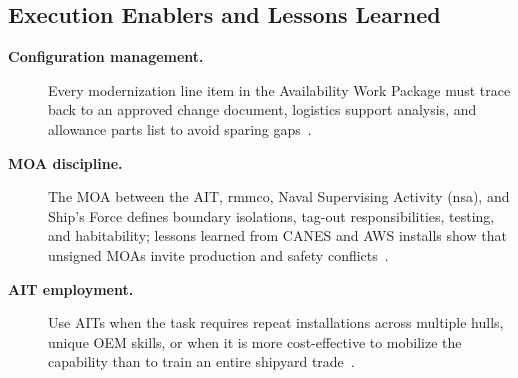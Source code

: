 \documentclass[../main.tex]{subfiles}
\begin{document}
\subsection{Execution Enablers and Lessons Learned}
\begin{description}
\item[\textbf{Configuration management.}] Every modernization line item in the Availability Work Package must trace back to an approved change document, logistics support analysis, and allowance parts list to avoid sparing gaps~\autocite{COMFLTFORCOMINST4790-3}.
\item[\textbf{MOA discipline.}] The MOA between the AIT, \ac{rmmco}, Naval Supervising Activity (\ac{nsa}), and Ship's Force defines boundary isolations, tag-out responsibilities, testing, and habitability; lessons learned from CANES and AWS installs show that unsigned MOAs invite production and safety conflicts~\autocite{TS9090-310,edo-4-1-2-navy-modernization-2025}.
\item[\textbf{AIT employment.}] Use AITs when the task requires repeat installations across multiple hulls, unique OEM skills, or when it is more cost-effective to mobilize the capability than to train an entire shipyard trade~\autocite{SL720-AA-MAN-030}.
\end{description}

\end{document}
